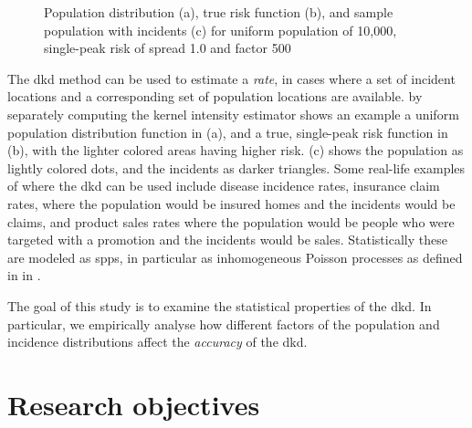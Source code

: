 \begin{figure}[htbp]
    
    \caption[]{Population distribution (a), true risk function (b), and sample population with incidents (c) for uniform population of 10,000, single-peak risk of \gls{spread} 1.0 and \gls{factor} 500}
    \label{fig:method:distributions:unif_500_1.0_1h}    
\end{figure}
\setpath{}
The \gls{dkd} method can be used to estimate a \textit{rate},
in cases where a set of incident locations and a corresponding set of population locations are available.
by separately computing the \gls{kernel intensity estimator}
 shows an example a uniform population distribution function in (a),
and a true, single-peak risk function in (b),
with the lighter colored areas having higher risk.
(c) shows the population as lightly colored dots,
and the incidents as darker triangles.
Some real-life examples of where the \gls{dkd} can be used include disease incidence rates,
insurance claim rates,
where the population would be insured homes and the incidents would be claims,
and product sales rates where the population would be people who were targeted with a promotion and the incidents would be sales.
Statistically these are modeled as \glspl{spp},
in particular as inhomogeneous Poisson processes
as defined in  in .

The goal of this study is to examine the statistical properties of the \gls{dkd}.
In particular,
we empirically analyse how different factors of the population and incidence distributions
affect the \textit{accuracy} of the \gls{dkd}.

\section{Research objectives}
\label{sec:method:objectives}

